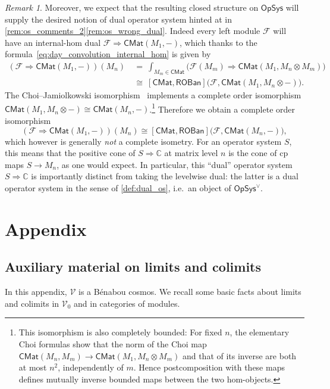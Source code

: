 \documentclass[11pt,onecolumn]{article}
\newcommand{\C}{\mathbb{C}}
\newcommand{\cV}{\mathscr{V}}
\newcommand{\ROBan}{\mathsf{ROBan}}
\newcommand{\OpSys}{\mathsf{OpSys}}
\theoremstyle{plain}
\theoremstyle{remark}
\newtheorem{remark}[remark]{Remark}
\theoremstyle{definition}
\begin{document}
\begin{remark}
	Moreover, we expect that the resulting closed structure on $\OpSys$ will supply the desired notion of dual operator system hinted at in \cref{rem:os_comments_2}\ref{rem:os_wrong_dual}.
	Indeed every left module $\mathcal{F}$ will have an internal-hom dual $\mathcal{F}\Rightarrow\mathsf{CMat}(M_1,-)$, which thanks to the formula~\eqref{eq:day_convolution_internal_hom} is given by
	\begin{align*}
		(\mathcal{F}\Rightarrow\mathsf{CMat}(M_1,-))(M_n)
		&\:=\:
		\int_{M_m\in\mathsf{CMat}}
		\bigl(\mathcal{F}(M_m) \Rightarrow 
		\mathsf{CMat}(M_1, M_n\otimes M_m)\bigr) \\[3pt]
		&\:\cong\:
		[\mathsf{CMat},\ROBan]\bigl(\mathcal{F},\mathsf{CMat}(M_1, M_n\otimes-)\bigr).
	\end{align*}
	The Choi--Jamiolkowski isomorphism~\cite[Theorem~3.14]{Paulsen} implements a complete order isomorphism $\mathsf{CMat}(M_1,M_n\otimes -) \cong \mathsf{CMat}(M_n,-)$.\footnote{This isomorphism is also completely bounded: For fixed $n$, the elementary Choi formulas show that the norm of the Choi map
		$\mathsf{CMat}(M_n,M_m)\to\mathsf{CMat}(M_1,M_n\otimes M_m)$ and that of its inverse are both at most $n^2$, independently of $m$.
		Hence postcomposition with these maps defines mutually inverse bounded maps between the two hom-objects.}
	Therefore we obtain a complete order isomorphism
	\[
		(\mathcal{F}\Rightarrow\mathsf{CMat}(M_1,-))(M_n)
		\cong
		[\mathsf{CMat},\ROBan]\bigl(\mathcal{F},\mathsf{CMat}(M_n,-)\bigr),
	\]
	which however is generally \emph{not} a complete isometry.
	For an operator system $S$, this means that the positive cone of $S\Rightarrow\C$ at matrix level $n$ 
	is the cone of cp maps $S\to M_n$, as one would expect.
	In particular, this ``dual'' operator system $S\Rightarrow\C$ is importantly distinct from taking the levelwise dual:
	the latter is a dual operator system in the sense of \cref{def:dual_os}, i.e.~an object of $\OpSys^\vee$.
\end{remark}
	

\appendix
\section{Appendix}
\label{sec:appendix}
\subsection{Auxiliary material on limits and colimits}
\label{app:limits_colimits}

In this appendix, $\cV$ is a B\'enabou cosmos.
We recall some basic facts about limits and colimits in $\cV_0$ and in categories of modules.
\end{document}
